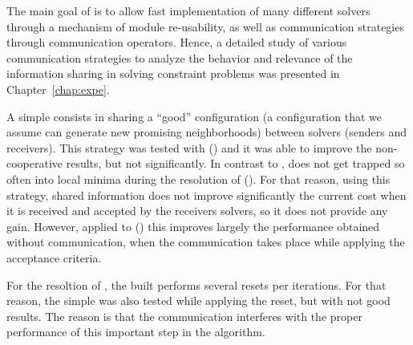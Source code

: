 
The main goal of \posl{} is to allow fast implementation of many different solvers through a mechanism of module re-usability, as well as communication strategies through communication operators. Hence, a detailed study of various communication strategies to analyze the behavior and relevance of the information sharing in solving constraint problems was presented in Chapter~\ref{chap:expe}.

A simple \commstr{} consists in sharing a ``good'' configuration (a configuration that we assume can generate new promising neighborhoods) between solvers (senders and receivers). This strategy was tested with \sgp{} (\SGP) and it was able to improve the non-cooperative results, but not significantly. In contrast to \SGP, \posl{} does not get trapped so often into local minima during the resolution of \nqp{} (\NQP{}). For that reason, using this strategy, shared information does not improve significantly the current cost when it is received and accepted by the receivers solvers, so it does not provide any gain. However, applied to \carrp{} (\CARRP) this \commstr{} improves largely the performance obtained without communication, when the communication takes place while applying the acceptance criteria.

For the resoltion of \CARRP{}, the built \as{} performs several resets per iterations. For that reason, the simple \commstr{} was also tested while applying the reset, but with not good results. The reason is that the communication interferes with the proper performance of this important step in the algorithm.

